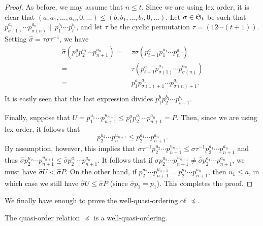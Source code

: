 \begin{proof}
As before, we may assume that $n \leq t$.  Since we are using lex
order, it is clear that $(a, a_1,\ldots,a_n,0,\ldots) \leq
(b,b_1,\ldots,b_t,0,\ldots)$.  Let $\sigma \in {\frak S}_t$ be
such that $p_{\sigma(1)}^{a_1} \cdots p_{\sigma(n)}^{a_n} \, \mid
\, p_{1}^{b_1} \cdots p_{t}^{b_t}$, and let $\tau$ be the cyclic
permutation $\tau = (12 \cdots (t+1))$.  Setting $\hat{\sigma} =
\tau \sigma \tau^{-1}$, we have
\begin{equation*}
\begin{split}
\hat{\sigma} \left(p_1^a p_{2}^{a_1} \cdots p_{n+1}^{a_n} \right)
= \ &  \tau \sigma
\left(p_{t+1}^a p_{1}^{a_1} \cdots p_{n}^{a_n}\right)  \\
= \ & \tau \left(p_{t+1}^a p_{\sigma(1)}^{a_1} \cdots
p_{\sigma(n)}^{a_n}\right) \\
= \ & p_{1}^a p_{\sigma(1)+1}^{a_1} \cdots p_{\sigma(n)+1}^{a_n}.
\\
\end{split}
\end{equation*}
It is easily seen that this last expression divides
$p_{1}^{b}p_{2}^{b_1} \cdots p_{t+1}^{b_t}$.

Finally, suppose that $U = p_1^{u_1} \cdots p_{n+1}^{u_{n+1}} \leq
p_1^{a}p_{2}^{a_1} \cdots p_{n+1}^{a_n} = P$.  Then, since we are
using lex order, it follows that \[p_2^{u_2} \cdots
p_{n}^{u_{n+1}} \leq p_{2}^{a_1} \cdots p_{n+1}^{a_n}.\] By
assumption, however, this implies that $\sigma \tau^{-1} p_2^{u_2}
\cdots p_{n+1}^{u_{n+1}} \leq \sigma \tau^{-1} p_{2}^{a_1} \cdots
p_{n+1}^{a_n}$ and thus $\hat{\sigma} p_2^{u_2} \cdots
p_{n+1}^{u_{n+1}} \leq \hat{\sigma} p_{2}^{a_1} \cdots
p_{n+1}^{a_n}$.  It follows that if $\hat{\sigma} p_2^{u_2} \cdots
p_{n+1}^{u_{n+1}} \neq \hat{\sigma} p_{2}^{a_1} \cdots
p_{n+1}^{a_n}$, we must have $\hat{\sigma} U < \hat{\sigma} P$. On
the other hand, if $p_2^{u_2} \cdots p_{n+1}^{u_{n+1}} =
p_{2}^{a_1} \cdots p_{n+1}^{a_n}$, then $u_1 \leq a$, in which
case we still have $\hat{\sigma} U \leq \hat{\sigma} P$ (since
$\hat{\sigma}p_1 = p_1$).  This completes the proof.
\end{proof}

We finally have enough to prove the well-quasi-ordering of
$\preceq$.

\begin{theorem}
The quasi-order relation $\preceq$ is a well-quasi-ordering.
\end{theorem}

